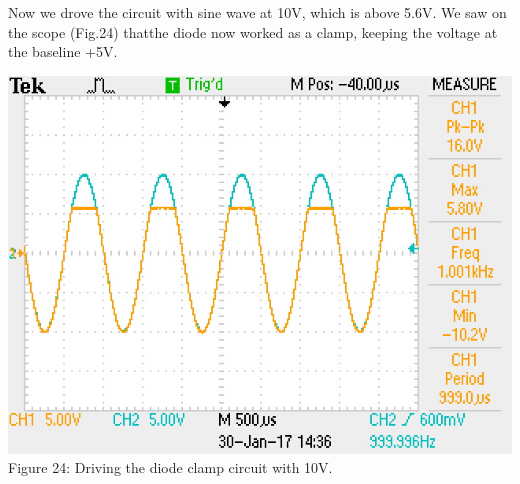 \documentclass[]{article}
\begin{document}
Now we drove the circuit with sine wave at 10V, which is above 5.6V. We saw on the scope (Fig.24) thatthe diode now worked as a clamp, keeping the voltage at the baseline +5V.
\begin{center}
	\includegraphics[scale=0.8]{k_above}\\
	Figure 24: Driving the diode clamp circuit with 10V.
\end{center}
\end{document}
